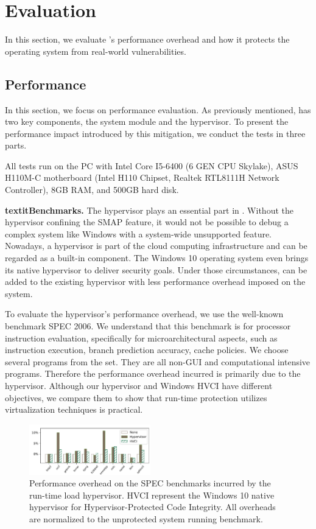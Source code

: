 
\section{Evaluation}
\label{sec:ktoctou-evaluation}

In this section, we evaluate \name's performance overhead and how it protects the operating system from real-world vulnerabilities.


\subsection{Performance}
In this section, we focus on performance evaluation.
As previously mentioned, \name has two key components, the system module and the hypervisor. To present the performance impact introduced by this mitigation, we conduct the tests in three parts. 

All tests run on the PC with Intel Core I5-6400 (6 GEN CPU Skylake), ASUS H110M-C motherboard (Intel H110 Chipset, Realtek RTL8111H Network Controller), 8GB RAM, and 500GB hard disk.

\textbf{textit{Benchmarks.}} The hypervisor plays an essential part in \name. Without the hypervisor confining the SMAP feature, it would not be possible to debug a complex system like Windows with a system-wide unsupported feature. Nowadays, a hypervisor is part of the cloud computing infrastructure and can be regarded as a built-in component. The Windows 10 operating system even brings its native hypervisor to deliver security goals. Under those circumstances, \name can be added to the existing hypervisor with less performance overhead imposed on the system. 

To evaluate the hypervisor's performance overhead, we use the well-known benchmark SPEC 2006. We understand that this benchmark is for processor instruction evaluation, specifically for microarchitectural aspects, such as instruction execution, branch prediction accuracy, cache policies. We choose several programs from the set. They are all non-GUI and computational intensive programs. Therefore the performance overhead incurred is primarily due to the hypervisor. Although our hypervisor and Windows HVCI have different objectives, we compare them to show that run-time protection utilizes virtualization techniques is practical.

\begin{figure}[th]
  \includegraphics[width=0.47\textwidth]{figures/benchmark3}
  \centering
  \caption{Performance overhead on the SPEC benchmarks incurred by the run-time load hypervisor. HVCI represent the Windows 10 native hypervisor for Hypervisor-Protected Code Integrity. All overheads are normalized to the unprotected system running benchmark.}
  \label{fig:ktoctou-benchmark}
\end{figure}


